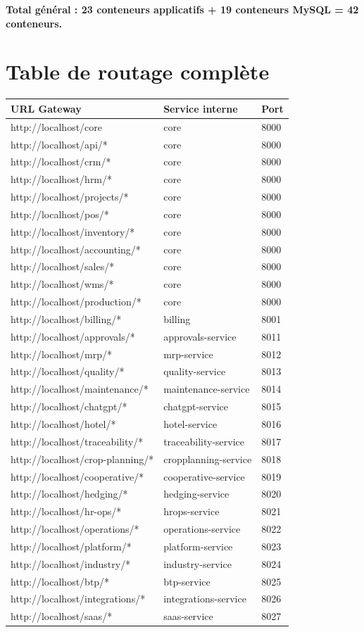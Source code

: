 \documentclass{article}
\begin{document}
\textbf{Total général : 23 conteneurs applicatifs + 19 conteneurs MySQL = 42 conteneurs.}

\section{Table de routage complète}

\begin{longtable}{p{5cm}p{5cm}p{2cm}}
\toprule
\textbf{URL Gateway} & \textbf{Service interne} & \textbf{Port} \\
\midrule
http://localhost/core & core & 8000 \\
http://localhost/api/* & core & 8000 \\
http://localhost/crm/* & core & 8000 \\
http://localhost/hrm/* & core & 8000 \\
http://localhost/projects/* & core & 8000 \\
http://localhost/pos/* & core & 8000 \\
http://localhost/inventory/* & core & 8000 \\
http://localhost/accounting/* & core & 8000 \\
http://localhost/sales/* & core & 8000 \\
http://localhost/wms/* & core & 8000 \\
http://localhost/production/* & core & 8000 \\
http://localhost/billing/* & billing & 8001 \\
http://localhost/approvals/* & approvals-service & 8011 \\
http://localhost/mrp/* & mrp-service & 8012 \\
http://localhost/quality/* & quality-service & 8013 \\
http://localhost/maintenance/* & maintenance-service & 8014 \\
http://localhost/chatgpt/* & chatgpt-service & 8015 \\
http://localhost/hotel/* & hotel-service & 8016 \\
http://localhost/traceability/* & traceability-service & 8017 \\
http://localhost/crop-planning/* & cropplanning-service & 8018 \\
http://localhost/cooperative/* & cooperative-service & 8019 \\
http://localhost/hedging/* & hedging-service & 8020 \\
http://localhost/hr-ops/* & hrops-service & 8021 \\
http://localhost/operations/* & operations-service & 8022 \\
http://localhost/platform/* & platform-service & 8023 \\
http://localhost/industry/* & industry-service & 8024 \\
http://localhost/btp/* & btp-service & 8025 \\
http://localhost/integrations/* & integrations-service & 8026 \\
http://localhost/saas/* & saas-service & 8027 \\
\bottomrule
\end{longtable}
\end{document}
